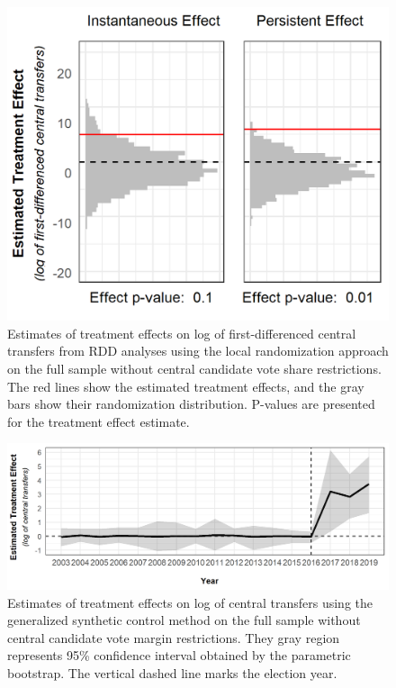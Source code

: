 \documentclass[12pt]{article}
\newcommand{\1}{\mathbbm{1}}
\begin{document}
\begin{figure}[!htbp]
	\centering
	\includegraphics[]{figure/210202_rdd_simple_results.png}
	\captionsetup{singlelinecheck=off}
	\caption[Estimated RDD treatment effects]{Estimates of treatment effects on log of first-differenced central transfers from RDD analyses using the local randomization approach on the full sample without central candidate vote share restrictions. The red lines show the estimated treatment effects, and the gray bars show their randomization distribution. P-values are presented for the treatment effect estimate.}
	\label{fig:rdd_simple}
\end{figure}

\begin{figure}[!htbp]
	\centering
	\includegraphics[width=\textwidth]{figure/210125_synth_simple_results.png}
	\captionsetup{singlelinecheck=off}
	\caption[Estimated synthetic control treatment effects]{Estimates of treatment effects on log of central transfers using the generalized synthetic control method on the full sample without central candidate vote margin restrictions. They gray region represents 95\% confidence interval obtained by the parametric bootstrap. The vertical dashed line marks the election year.}
	\label{fig:synth_simple}
\end{figure}
\end{document}
